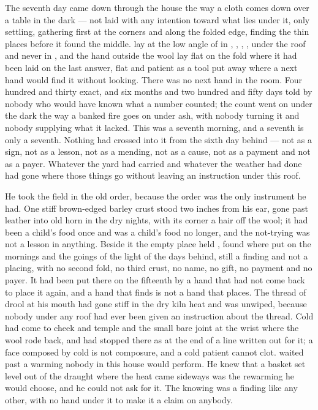 
The seventh day came down through the house the way a cloth comes down over a table in the dark --- not laid with any intention toward what lies under it, only settling, gathering first at the corners and along the folded edge, finding the thin places before it found the middle.  lay at the low angle of  in , , , , under the roof and never in , and the hand outside the wool lay flat on the fold where it had been laid on the last answer, flat and patient as a tool put away where a next hand would find it without looking. There was no next hand in the room. Four hundred and thirty exact, and six months and two hundred and fifty days told by nobody who would have known what a number counted; the count went on under the dark the way a banked fire goes on under ash, with nobody turning it and nobody supplying what it lacked. This was a seventh morning, and a seventh is only a seventh. Nothing had crossed into it from the sixth day behind --- not as a sign, not as a lesson, not as a mending, not as a cause, not as a payment and not as a payer. Whatever the yard had carried and whatever the weather had done had gone where those things go without leaving an instruction under this roof.

He took the field in the old order, because the order was the only instrument he had. One stiff brown-edged barley crust stood two inches from his ear, gone past leather into old horn in the dry nights, with its corner a hair off the wool; it had been a child's food once and was a child's food no longer, and the not-trying was not a lesson in anything. Beside it the empty place held , found where put on the mornings and the goings of the light of the days behind, still a finding and not a placing, with no second fold, no third crust, no name, no gift, no payment and no payer. It had been put there on the fifteenth by a hand that had not come back to place it again, and a hand that finds is not a hand that places. The thread of drool at his mouth had gone stiff in the dry kiln heat and was unwiped, because nobody under any roof had ever been given an instruction about the thread. Cold had come to cheek and temple and the small bare joint at the wrist where the wool rode back, and had stopped there as at the end of a line written out for it; a face composed by cold is not composure, and a cold patient cannot clot.  waited past a warming nobody in this house would perform. He knew that a basket set level out of the draught where the heat came sideways was the rewarming he would choose, and he could not ask for it. The knowing was a finding like any other, with no hand under it to make it a claim on anybody.

